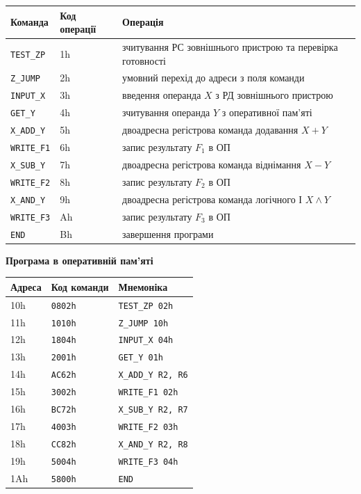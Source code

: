 \documentclass[12pt,a4paper]{article}
\newcommand{\sectiontitle}[1]{\begin{center} \textbf{\large #1} \end{center}}
\begin{document}
\begin{center}
\small
\begin{tabular}{|C{2.5cm}|C{2cm}|p{8cm}|}
    \hline
    \textbf{Команда} & \textbf{Код операції} & \textbf{Операція} \\ \hline
    \texttt{TEST\_ZP} & 1h & зчитування РС зовнішнього пристрою та перевірка готовності \\ \hline
    \texttt{Z\_JUMP} & 2h & умовний перехід до адреси з поля команди \\ \hline
    \texttt{INPUT\_X} & 3h & введення операнда $X$ з РД зовнішнього пристрою \\ \hline
    \texttt{GET\_Y} & 4h & зчитування операнда $Y$ з оперативної пам'яті \\ \hline
    \texttt{X\_ADD\_Y} & 5h & двоадресна регістрова команда додавання $X + Y$ \\ \hline
    \texttt{WRITE\_F1} & 6h & запис результату $F_1$ в ОП \\ \hline
    \texttt{X\_SUB\_Y} & 7h & двоадресна регістрова команда віднімання $X - Y$ \\ \hline
    \texttt{WRITE\_F2} & 8h & запис результату $F_2$ в ОП \\ \hline
    \texttt{X\_AND\_Y} & 9h & двоадресна регістрова команда логічного І $X \wedge Y$ \\ \hline
    \texttt{WRITE\_F3} & Ah & запис результату $F_3$ в ОП \\ \hline
    \texttt{END} & Bh & завершення програми \\ \hline
\end{tabular}
\end{center}

\sectiontitle{Програма в оперативній пам'яті}

\begin{center}
\small
\begin{tabular}{|C{1.5cm}|C{4cm}|p{7cm}|}
    \hline
    \textbf{Адреса} & \textbf{Код команди} & \textbf{Мнемоніка} \\ \hline
    10h & \texttt{0802h} & \texttt{TEST\_ZP 02h} \\ \hline
    11h & \texttt{1010h} & \texttt{Z\_JUMP 10h} \\ \hline
    12h & \texttt{1804h} & \texttt{INPUT\_X 04h} \\ \hline
    13h & \texttt{2001h} & \texttt{GET\_Y 01h} \\ \hline
    14h & \texttt{AC62h} & \texttt{X\_ADD\_Y R2, R6} \\ \hline
    15h & \texttt{3002h} & \texttt{WRITE\_F1 02h} \\ \hline
    16h & \texttt{BC72h} & \texttt{X\_SUB\_Y R2, R7} \\ \hline
    17h & \texttt{4003h} & \texttt{WRITE\_F2 03h} \\ \hline
    18h & \texttt{CC82h} & \texttt{X\_AND\_Y R2, R8} \\ \hline
    19h & \texttt{5004h} & \texttt{WRITE\_F3 04h} \\ \hline
    1Ah & \texttt{5800h} & \texttt{END} \\ \hline
\end{tabular}
\end{center}
\normalsize
\end{document}
